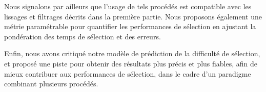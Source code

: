 	Nous signalons par ailleurs que l'usage de tels procédés est compatible avec les lissages et filtrages décrits dans la première partie. Nous proposons également une métrie paramétrable pour quantifier les performances de sélection en ajustant la pondération des temps de sélection et des erreurs.
	
	Enfin, nous avons critiqué notre modèle de prédiction de la difficulté de sélection, et proposé une piste pour obtenir des résultats plus précis et plus fiables, afin de mieux contribuer aux performances de sélection, dans le cadre d'un paradigme combinant plusieurs procédés.

\clearpage